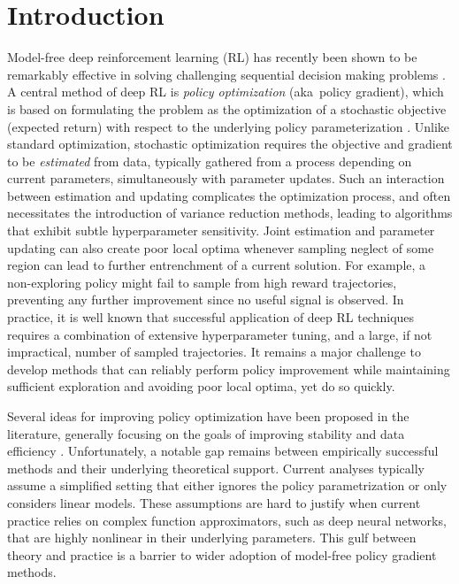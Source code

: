
\section{Introduction}
\label{sec:intro}


Model-free deep reinforcement learning (RL) has recently
been shown to be remarkably effective in solving
challenging sequential decision making problems
\citep{schulman2015trust,mnih2015human,silver2016mastering}.
A central method of deep RL is \emph{policy optimization}
(aka\ policy gradient),
which is based on formulating the problem
as the optimization of a stochastic objective (expected return)
with respect to the underlying policy parameterization
\citep{williams1991function,williams1992simple,sutton1998reinforcement}.
Unlike standard optimization,
stochastic optimization requires the objective and gradient to be 
\emph{estimated} from data,
typically gathered from a process depending on current parameters, 
simultaneously with parameter updates.
Such an interaction between estimation and updating
complicates the optimization process,
and often necessitates the introduction of variance reduction methods,
leading to algorithms that exhibit subtle hyperparameter sensitivity.
Joint estimation and parameter updating can also create poor local optima
whenever sampling neglect of some region
can lead to further entrenchment of a current solution.
For example, a non-exploring policy might fail to sample from high
reward trajectories,
preventing any further improvement since no useful signal is observed.
In practice, it is well known that successful application of deep RL techniques
requires a combination of extensive hyperparameter tuning,
and a large, if not impractical, number of sampled trajectories.
It remains a major challenge to develop methods that can reliably
perform policy improvement while maintaining sufficient exploration
and avoiding poor local optima, yet do so quickly.

Several ideas for improving policy optimization have been proposed
in the literature, 
generally focusing on the goals of improving stability and data efficiency
\citep{peters2010relative,van2015learning,fox2015taming,schulman2015trust,montgomery2016guided,nachum2017bridging,nachum2017trust,tangkaratt2017guide,abdolmaleki2018maximum,haarnoja2018soft}. 
Unfortunately, a notable gap remains between empirically successful methods 
and their underlying theoretical support.
Current analyses typically assume a simplified setting that either ignores the 
policy parametrization or only considers linear models.
These assumptions are hard to justify when current practice relies on 
complex function approximators, such as deep neural networks,
that are highly nonlinear in their underlying parameters.
This gulf between theory and practice is
a barrier to wider adoption of model-free policy gradient methods.

